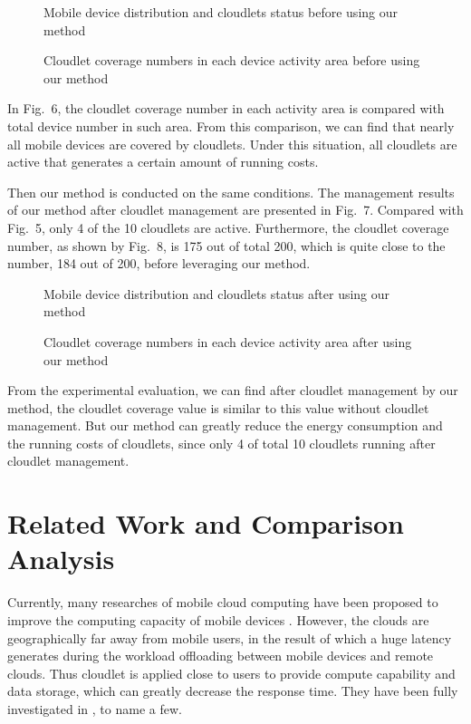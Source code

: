 \documentclass{llncs}
\begin{document}
\begin{figure}
\centering
{}
\caption{Mobile device distribution and cloudlets status before using our method}
\end{figure}

\begin{figure}
\centering
{}
\caption{Cloudlet coverage numbers in each device activity area before using our method}
\end{figure}

In Fig.~6, the cloudlet coverage number in each activity area is compared with total device number in such area. From this comparison, we can find that nearly all mobile devices are covered by cloudlets. Under this situation, all cloudlets are active that generates a certain amount of running costs.

Then our method is conducted on the same conditions. The management results of our method after cloudlet management are presented in Fig.~7. Compared with Fig.~5, only 4 of the 10 cloudlets are active. Furthermore, the cloudlet coverage number, as shown by Fig.~8, is 175 out of total 200, which is quite close to the number, 184 out of 200, before leveraging our method.

\begin{figure}
\centering
{}
\caption{Mobile device distribution and cloudlets status after using our method}
\end{figure}

\begin{figure}
\centering
{}
\caption{Cloudlet coverage numbers in each device activity area after using our method}
\end{figure}

From the experimental evaluation, we can find after cloudlet management by our method, the cloudlet coverage value is similar to this value without cloudlet management. But our method can greatly reduce the energy consumption and the running costs of cloudlets, since only 4 of total 10 cloudlets running after cloudlet management.

\section{Related Work and Comparison Analysis}

Currently, many researches of mobile cloud computing have been proposed to improve the computing capacity of mobile devices \cite{lo:gao,chen}. However, the clouds are geographically far away from mobile users, in the result of which a huge latency generates during the workload offloading between mobile devices and remote clouds. Thus cloudlet is applied close to users to provide compute capability and data storage, which can greatly decrease the response time. They have been fully investigated in \cite{khan:wang,xia:liang,bahtovski,whaiduzzaman,artail:frenn}, to name a few.
\end{document}
